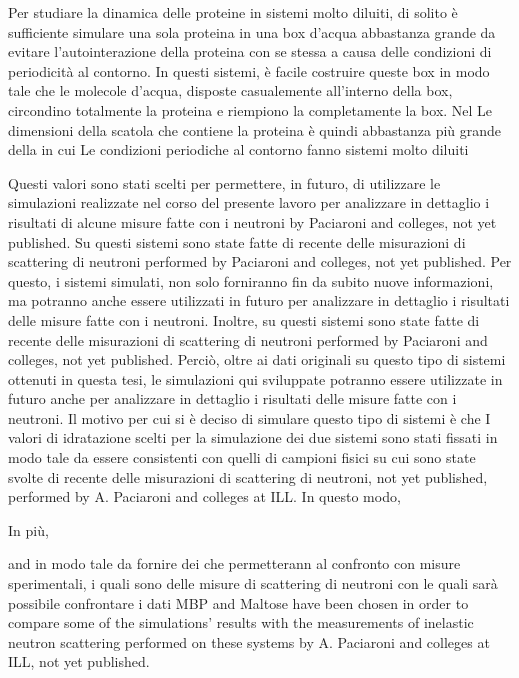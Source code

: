 Per studiare la dinamica delle proteine in sistemi molto diluiti, di solito è sufficiente simulare una sola proteina in una box d'acqua abbastanza grande da evitare l'autointerazione della proteina con se stessa a causa delle condizioni di periodicità al contorno. In questi sistemi, è facile costruire queste box in modo tale che le molecole d'acqua, disposte casualemente all'interno della box, circondino totalmente la proteina e riempiono la completamente la box. 
 Nel  Le dimensioni della scatola che contiene la proteina è quindi abbastanza più grande della  in cui  Le condizioni periodiche al contorno fanno  sistemi molto diluiti


 Questi valori sono stati scelti per permettere, in futuro, di utilizzare le simulazioni realizzate nel corso del presente lavoro per analizzare in dettaglio i risultati di alcune misure fatte con i neutroni by Paciaroni and colleges, not yet published.
Su questi sistemi sono state fatte di recente delle misurazioni di scattering di neutroni performed by Paciaroni and colleges, not yet published. Per questo, i sistemi simulati, non solo forniranno fin da subito nuove informazioni, ma potranno anche essere utilizzati in futuro per analizzare in dettaglio i risultati delle misure fatte con i neutroni.
 Inoltre, su questi sistemi sono state fatte di recente delle misurazioni di scattering di neutroni performed by Paciaroni and colleges, not yet published. Perciò, oltre ai dati originali su questo tipo di sistemi ottenuti in questa tesi, le simulazioni qui sviluppate potranno essere utilizzate in futuro anche per analizzare in dettaglio i risultati delle misure fatte con i neutroni. 
Il motivo per cui si è deciso di simulare questo tipo di sistemi è che 
I valori di idratazione scelti per la simulazione dei due sistemi sono stati fissati in modo tale da essere consistenti con quelli di campioni fisici su cui sono state svolte di recente delle misurazioni di scattering di neutroni, not yet published, performed by A. Paciaroni and colleges at ILL. In questo modo, 

 In più, 

and 
in modo tale da fornire dei che permetterann al confronto con misure sperimentali, i quali sono  delle misure di scattering di neutroni con le quali sarà possibile confrontare i dati
MBP and Maltose have been chosen in order to compare some of the simulations' results with the measurements of inelastic neutron scattering performed on these systems by A. Paciaroni and colleges at ILL, not yet published.


